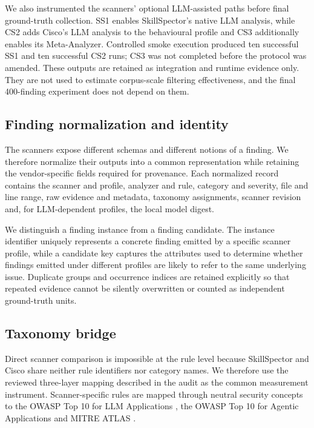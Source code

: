 \documentclass[conference]{IEEEtran}
\begin{document}
We also instrumented the scanners' optional LLM-assisted paths before final ground-truth collection. SS1 enables SkillSpector's native LLM analysis, while CS2 adds Cisco's LLM analysis to the behavioural profile and CS3 additionally enables its Meta-Analyzer. Controlled smoke execution produced ten successful SS1 and ten successful CS2 runs; CS3 was not completed before the protocol was amended. These outputs are retained as integration and runtime evidence only. They are not used to estimate corpus-scale filtering effectiveness, and the final 400-finding experiment does not depend on them.

\subsection{Finding normalization and identity}

The scanners expose different schemas and different notions of a finding. We therefore normalize their outputs into a common representation while retaining the vendor-specific fields required for provenance. Each normalized record contains the scanner and profile, analyzer and rule, category and severity, file and line range, raw evidence and metadata, taxonomy assignments, scanner revision and, for LLM-dependent profiles, the local model digest.

We distinguish a finding instance from a finding candidate. The instance identifier uniquely represents a concrete finding emitted by a specific scanner profile, while a candidate key captures the attributes used to determine whether findings emitted under different profiles are likely to refer to the same underlying issue. Duplicate groups and occurrence indices are retained explicitly so that repeated evidence cannot be silently overwritten or counted as independent ground-truth units.

\subsection{Taxonomy bridge}

Direct scanner comparison is impossible at the rule level because SkillSpector and Cisco share neither rule identifiers nor category names. We therefore use the reviewed three-layer mapping described in the audit as the common measurement instrument. Scanner-specific rules are mapped through neutral security concepts to the OWASP Top 10 for LLM Applications \cite{ref8}, the OWASP Top 10 for Agentic Applications \cite{ref9} and MITRE ATLAS \cite{ref10}.
\end{document}

